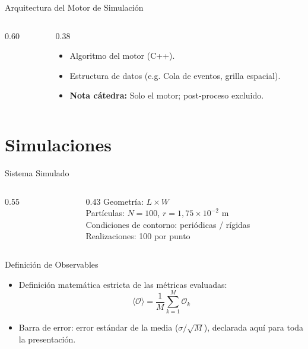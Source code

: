 \documentclass[aspectratio=169]{beamer}
\newcommand{\params}[1]{{\footnotesize #1}}
\begin{document}
\begin{frame}{Arquitectura del Motor de Simulación}
  \begin{columns}[c]
    \begin{column}{0.60\textwidth}
    \end{column}
    \begin{column}{0.38\textwidth}
      \begin{itemize}
        \item Algoritmo del motor (C++).
        \item Estructura de datos (e.g. Cola de eventos, grilla espacial).
        \item \textbf{Nota cátedra:} Solo el motor; post-proceso excluido.
      \end{itemize}
    \end{column}
  \end{columns}
\end{frame}

\section{Simulaciones}

\begin{frame}{Sistema Simulado}
  \begin{columns}[c]
    \begin{column}{0.55\textwidth}
    \end{column}
    \begin{column}{0.43\textwidth}
      \params{
        Geometría: $L \times W$\\[4pt]
        Partículas: $N = 100$, $r = 1{,}75\times10^{-2}$ m\\[4pt]
        Condiciones de contorno: periódicas / rígidas\\[4pt]
        Realizaciones: 100 por punto
      }
    \end{column}
  \end{columns}
\end{frame}

\begin{frame}{Definición de Observables}
  \begin{itemize}
    \item Definición matemática estricta de las métricas evaluadas:
      \begin{equation}
        \langle \mathcal{O} \rangle = \frac{1}{M} \sum_{k=1}^M \mathcal{O}_k
      \end{equation}
    \item Barra de error: error estándar de la media ($\sigma / \sqrt{M}$), declarada aquí para toda la presentación.
  \end{itemize}
\end{frame}
\end{document}
